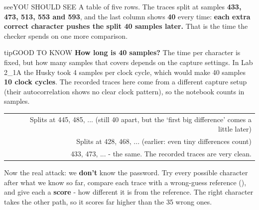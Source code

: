 \documentclass[11pt,letterpaper]{article}
\begin{document}
\vspace{4pt}


\begin{guidecallout}{see}{YOU SHOULD SEE}
A table of five rows. The traces split at samples \textbf{433, 473, 513, 553 and 593}, and the last column shows
\textbf{40} every time: \textbf{each extra correct character pushes the split 40 samples later.} That is the time the
checker spends on one more comparison.
\end{guidecallout}

\begin{guidecallout}{tip}{GOOD TO KNOW}
\textbf{How long is 40 samples?} The time per character is fixed, but how many samples that covers depends on the
capture settings. In Lab 2\_1A the Husky took 4 samples per clock cycle, which would make 40 samples \textbf{10 clock
cycles}. The recorded traces here come from a different capture setup (their autocorrelation shows no clear clock
pattern), so the notebook counts in samples.
\end{guidecallout}

{\small{}
\begin{longtable}{|R{0.3188}|R{0.6812}|}
\hline
{} &  \\ \hline
\endhead
\textbf{} & Splits at 445, 485, ... (still 40 apart, but the `first big difference' comes a little later) \\ \hline
\textbf{} & Splits at 428, 468, ... (earlier: even tiny differences count) \\ \hline
\textbf{} & 433, 473, ... - the same. The recorded traces are very clean. \\ \hline
\end{longtable}}

\clearpage



Now the real attack: we \textbf{don't} know the password. Try every possible character after what we know so far,
compare each trace with a wrong-guess reference (), and give each a \textbf{score} - how
different it is from the reference. The right character takes the other path, so it scores far higher than the 35
wrong ones.
\end{document}
